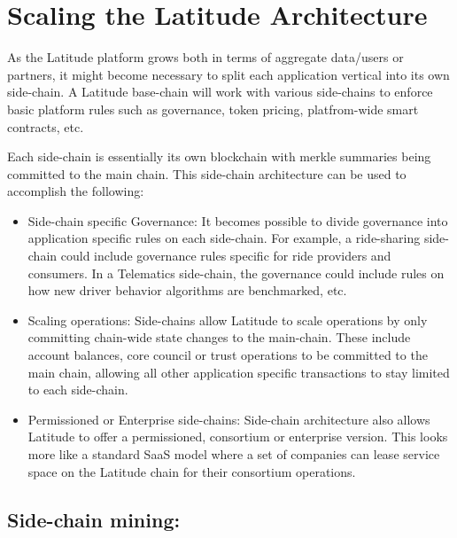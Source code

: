 \newpage
\section{Scaling the Latitude Architecture}
\label{app:latchain}

As the Latitude platform grows both in terms of aggregate data/users or partners, it might become necessary to split
each application vertical into its own side-chain. A Latitude base-chain will work with various side-chains to enforce
basic platform rules such as governance, token pricing, platfrom-wide smart contracts, etc.  

Each side-chain is essentially its own blockchain with merkle summaries being committed to the main chain. This
side-chain architecture can be used to accomplish the following:

\begin{itemize}
  \item Side-chain specific Governance: It becomes possible to divide governance into application specific rules on
        each side-chain. For example, a ride-sharing side-chain could include governance rules specific for ride
        providers and consumers. In a Telematics side-chain, the governance could include rules on how new driver
        behavior algorithms are benchmarked, etc.
  \item Scaling operations: Side-chains allow Latitude to scale operations by only committing chain-wide state changes
      to the main-chain. These include account balances, core council or trust operations to be committed to the main
        chain, allowing all other application specific transactions to stay limited to each side-chain.
  \item Permissioned or Enterprise side-chains: Side-chain architecture also allows Latitude to offer a permissioned,
      consortium or enterprise version. This looks more like a standard SaaS model where a set of companies can lease
        service space on the Latitude chain for their consortium operations.
\end{itemize}

\subsection{Side-chain mining:}

